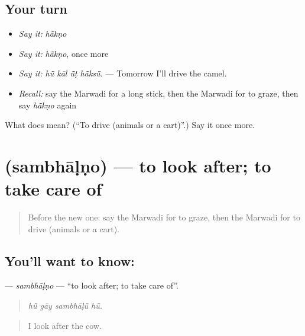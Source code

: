 \subsection*{Your turn}
\begin{itemize}
\raggedright
  \item \emph{Say it:} \emph{hā̃kṇo}
  \item \emph{Say it:} \emph{hā̃kṇo}, once more
  \item \emph{Say it:} \emph{hū̃ kāl ū̃ṭ hā̃ksū̃.} — Tomorrow I'll drive the camel.
  \item \emph{Recall:} say the Marwadi for a long stick, then the Marwadi for to graze, then say \emph{hā̃kṇo} again
\end{itemize}

\begin{tcolorbox}[breakable,colback=teal!4,colframe=teal!35!black,title={Before you move on}]
What does  mean? (\textquotedblleft{}To drive (animals or a cart)\textquotedblright{}.) Say it once more.
\end{tcolorbox}
\section[\texorpdfstring{\mw{संभाळणो} (sambhāḷṇo)}{संभाळणो (sambhāḷṇo)}]{ (sambhāḷṇo) — to look after; to take care of}

\label{lesson:MW-C234-sambhalno}



\begin{quote}
Before the new one: say the Marwadi for to graze, then the Marwadi for to drive (animals or a cart).
\end{quote}

\subsection*{You'll want to know: }
\textbf{} — \emph{sambhāḷṇo} — \textquotedblleft{}to look after; to take care of\textquotedblright{}.

\begin{quote}
   
\end{quote}

\begin{quote}
\emph{hū̃ gāy sambhāḷū̃ hū̃.}
\end{quote}

\begin{quote}
I look after the cow.
\end{quote}

